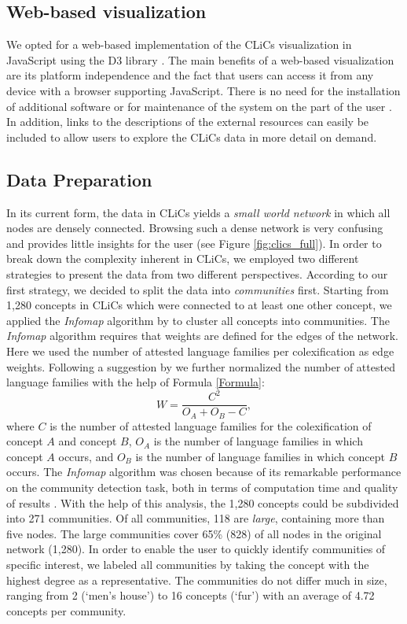 \subsection{Web-based visualization}

We opted for a web-based implementation of the CLiCs visualization in JavaScript using the D3 library \cite{D3}. The main benefits of a web-based visualization are its platform independence and the fact that users can access it from any device with a browser supporting JavaScript. There is no need for the installation of additional software or for maintenance of the system on the part of the user \cite{Murray}. In addition, links to the descriptions of the external resources can easily be included to allow users to explore the CLiCs data in more detail on demand. 

\subsection{Data Preparation}
In its current form, the data in CLiCs yields a \emph{small world network} in which all nodes are
densely connected. Browsing such a dense network is very confusing and provides little insights for
the user (see Figure \ref{fig:clics_full}). In order to break down the complexity inherent in CLiCs,
we employed two different strategies to present the data from two different perspectives. 
According to our first strategy, we decided to split the data
into \emph{communities} first. 
Starting from 1,280 concepts in CLiCs which
were connected to at least one other concept, we applied the \emph{Infomap} algorithm by
 to cluster all concepts into communities.
The \emph{Infomap} algorithm requires that weights are defined for the edges of the network.
Here we used the number of attested language families per colexification as edge weights. Following
a suggestion by  we
further normalized the number of attested language families with the help of Formula \ref{Formula}:
\begin{equation} \label{Formula}
    W = \frac{C^2}{O_A+O_B - C},
\end{equation}
where $C$ is the number of attested language families for the colexification of concept $A$ and
concept $B$, $O_A$ is the number of language families in which concept $A$ occurs, and $O_B$ is the
number of language families in which concept $B$ occurs. 
The \emph{Infomap} algorithm was chosen because of
its remarkable performance on the community detection task, both in terms of computation time and
quality of results \cite{Lancichinetti2009}.
With the help of this analysis, the 1,280 concepts
could be subdivided into 271 communities. 
Of all communities, 118 are \emph{large}, containing more than
five nodes. The large communities cover 65\% (828) of all nodes in the original network (1,280). In
order to enable the user to quickly identify communities of specific interest, we labeled all
communities by taking the concept with the highest degree as a representative. 
The communities do not differ much in size, ranging from 2 (`men's house') to 16 concepts (`{fur}')
with an average of 4.72 concepts per community.
 

